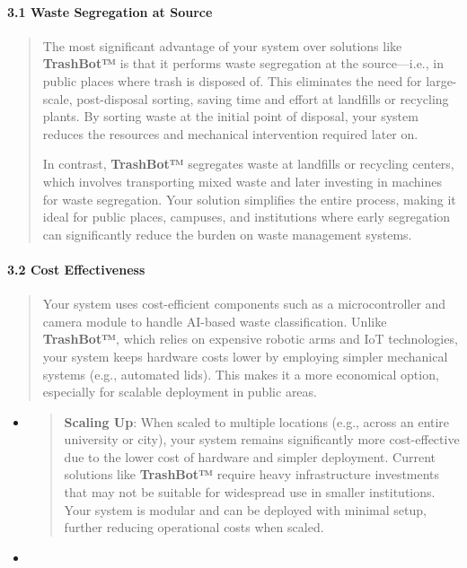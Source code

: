 \documentclass[
]{article}
\begin{document}
\hypertarget{waste-segregation-at-source}{%
\paragraph{3.1 Waste Segregation at
Source}\label{waste-segregation-at-source}}

\begin{quote}
The most significant advantage of your system over solutions like
\textbf{TrashBot™} is that it performs waste segregation at the
source---i.e., in public places where trash is disposed of. This
eliminates the need for large-scale, post-disposal sorting, saving time
and effort at landfills or recycling plants. By sorting waste at the
initial point of disposal, your system reduces the resources and
mechanical intervention required later on.

In contrast, \textbf{TrashBot™} segregates waste at landfills or
recycling centers, which involves transporting mixed waste and later
investing in machines for waste segregation. Your solution simplifies
the entire process, making it ideal for public places, campuses, and
institutions where early segregation can significantly reduce the burden
on waste management systems.
\end{quote}

\hypertarget{cost-effectiveness}{%
\paragraph{3.2 Cost Effectiveness}\label{cost-effectiveness}}

\begin{quote}
Your system uses cost-efficient components such as a microcontroller and
camera module to handle AI-based waste classification. Unlike
\textbf{TrashBot™}, which relies on expensive robotic arms and IoT
technologies, your system keeps hardware costs lower by employing
simpler mechanical systems (e.g., automated lids). This makes it a more
economical option, especially for scalable deployment in public areas.
\end{quote}

\begin{itemize}
\item
  \begin{quote}
  \textbf{Scaling Up}: When scaled to multiple locations (e.g., across
  an entire university or city), your system remains significantly more
  cost-effective due to the lower cost of hardware and simpler
  deployment. Current solutions like \textbf{TrashBot™} require heavy
  infrastructure investments that may not be suitable for widespread use
  in smaller institutions. Your system is modular and can be deployed
  with minimal setup, further reducing operational costs when scaled.
  \end{quote}
\item
\end{itemize}
\end{document}
